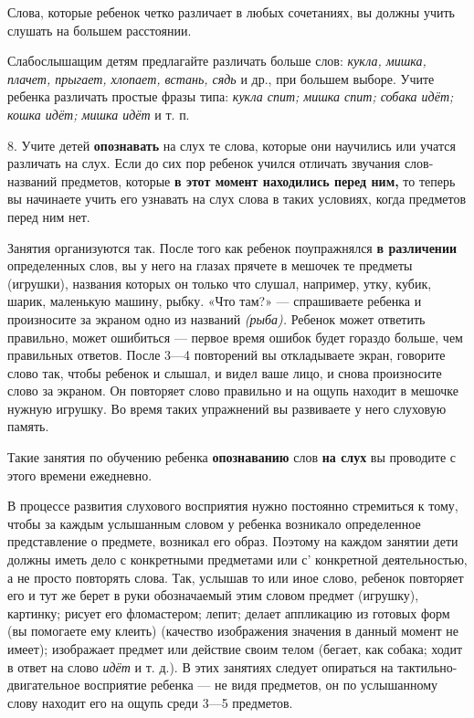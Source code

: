 \documentclass{book}
\renewcommand{\emph}[1]{\textit{#1}}
\begin{document}
Слова, которые ребенок четко различает в любых сочетаниях, вы должны
учить слушать на большем расстоянии.

Слабослышащим детям предлагайте различать больше слов: \emph{кукла,
мишка, плачет, прыгает, хлопает, встань, сядь} и др., при большем
выборе. Учите ребенка различать простые фразы типа: \emph{кукла спит;
мишка спит; собака идёт; кошка идёт; мишка идёт} и т. п.

8. Учите детей \textbf{опознавать} на слух те слова, которые они
научились или учатся различать на слух. Если до сих пор ребенок учился
отличать звучания слов-названий предметов, которые \textbf{в этот момент
находились перед ним,} то теперь вы начинаете учить его узнавать на слух
слова в таких условиях, когда предметов перед ним нет.

Занятия организуются так. После того как ребенок поупражнялся \textbf{в
различении} определенных слов, вы у него на глазах прячете в мешочек те
предметы (игрушки), названия которых он только что слушал, например,
утку, кубик, шарик, маленькую машину, рыбку. «Что там?» --- спрашиваете
ребенка и произносите за экраном одно из названий \emph{(рыба).} Ребенок
может ответить правильно, может ошибиться --- первое время ошибок будет
гораздо больше, чем правильных ответов. После 3---4 повторений вы
откладываете экран, говорите слово так, чтобы ребенок и слышал, и видел
ваше лицо, и снова произносите слово за экраном. Он повторяет слово
правильно и на ощупь находит в мешочке нужную игрушку. Во время таких
упражнений вы развиваете у него слуховую память.

Такие занятия по обучению ребенка \textbf{опознаванию} слов \textbf{на
слух} вы проводите с этого времени ежедневно.

В процессе развития слухового восприятия нужно постоянно стремиться к
тому, чтобы за каждым услышанным словом у ребенка возникало определенное
представление о предмете, возникал его образ. Поэтому на каждом занятии
дети должны иметь дело с конкретными предметами или с' конкретной
деятельностью, а не просто повторять слова. Так, услышав то или иное
слово, ребенок повторяет его и тут же берет в руки обозначаемый этим
словом предмет (игрушку), картинку; рисует его фломастером; лепит;
делает аппликацию из готовых форм (вы помогаете ему клеить) (качество
изображения значения в данный момент не имеет); изображает предмет или
действие своим телом (бегает, как собака; ходит в ответ на слово
\emph{идёт} и т. д.). В этих занятиях следует опираться на
тактильно-двигательное восприятие ребенка --- не видя предметов, он по
услышанному слову находит его на ощупь среди 3---5 предметов.
\end{document}
